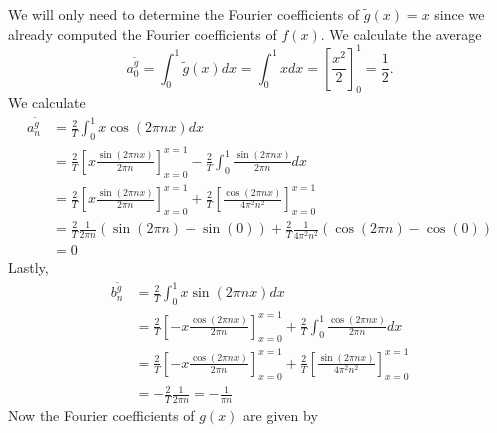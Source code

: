 \documentclass[11pt]{article}
\begin{document}
\begin{solution}
\begin{itemize}
        We will only need to determine the Fourier coefficients of $\tilde{g}(x) = x$ since we already computed the Fourier coefficients of $f(x)$. 
        We calculate the average 
        \[
            a_0^{\tilde g} = \int_{0}^{1} \tilde{g}(x) dx  = \int_{0}^{1} x dx  = \left[ \frac{x^2}{2} \right]_{0}^{1} = \frac 1 2.
        \]
        We calculate 
        \begin{align*}
            a_n^{\tilde g} 
            &
            = 
            \frac{2}{T}
            \int_{0}^{1} x \cos(2\pi n x) dx
            \\&
            =
            \frac{2}{T}
            \left[ x \frac{ \sin(2\pi n x) }{ 2\pi n } \right]_{x=0}^{x=1}
            -
            \frac{2}{T}
            \int_{0}^{1} \frac{ \sin(2\pi n x) }{ 2\pi n } dx
            \\&
            =
            \frac{2}{T}
            \left[ x \frac{ \sin(2\pi n x) }{ 2\pi n } \right]_{x=0}^{x=1}
            +
            \frac{2}{T}
            \left[ \frac{ \cos(2\pi n x) }{ 4\pi^2 n^2 } \right]_{x=0}^{x=1}
            \\&
            =
            \frac{2}{T}
            \frac{1}{2\pi n}
            \left( \sin(2\pi n) - \sin(0) \right)
            +
            \frac{2}{T}
            \frac{1}{ 4\pi^2 n^2 }
            \left( \cos(2\pi n) - \cos(0) \right)
            \\&
            =
            0
        \end{align*}	
        Lastly, 
        \begin{align*}
            b_n^{\tilde g} 
            &
            = 
            \frac{2}{T}
            \int_{0}^{1} x \sin(2\pi n x) dx
            \\&
            =
            \frac{2}{T}
            \left[- x \frac{ \cos(2\pi n x) }{ 2\pi n } \right]_{x=0}^{x=1}
            +
            \frac{2}{T}
            \int_{0}^{1} \frac{ \cos(2\pi n x) }{ 2\pi n } dx
            \\&
            =
           \frac{2}{T}
            \left[- x \frac{ \cos(2\pi n x) }{ 2\pi n } \right]_{x=0}^{x=1}
            +
            \frac{2}{T}
            \left[ \frac{ \sin(2\pi n x) }{ 4\pi^2 n^2 } \right]_{x=0}^{x=1}
            \\&
            = 
            -\frac{2}{T}\frac{1}{2\pi n} =  -\frac{1}{\pi n} 
        \end{align*}	
        Now the Fourier coefficients of $g(x)$ are given by
                \begin{align*}

\end{align*}
\end{itemize}
\end{solution}
\end{document}
